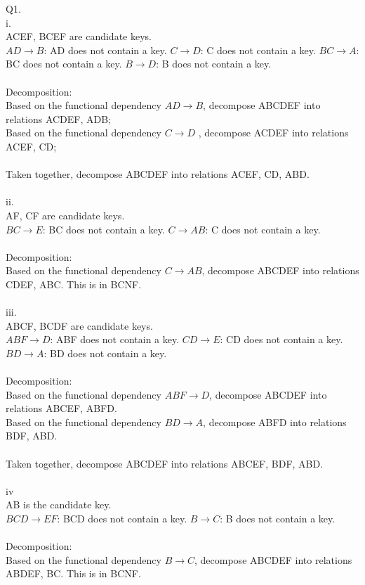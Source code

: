 \documentclass[a4paper]{article}
\begin{document}
Q1.\\
i.\\
ACEF, BCEF are candidate keys.\\
$AD\rightarrow B$: AD does not contain a key. $C\rightarrow D$: C does not contain a key. $BC\rightarrow A$: BC does not contain a key. $B\rightarrow D$: B does not contain a key.\\\\
Decomposition:\\
Based on the functional dependency $AD\rightarrow B$, decompose ABCDEF into relations ACDEF, ADB;\\
Based on the functional dependency $C\rightarrow D$ , decompose ACDEF into relations ACEF, CD;\\\\
Taken together, decompose ABCDEF into relations ACEF, CD, ABD.\\
\\ii.\\
AF, CF are candidate keys.\\
$BC\rightarrow E$: BC does not contain a key. $C\rightarrow AB$: C does not contain a key.\\\\
Decomposition:\\
Based on the functional dependency $C\rightarrow AB$, decompose ABCDEF into relations CDEF, ABC. This is in BCNF.\\
\\iii.\\
ABCF, BCDF are candidate keys.\\
$ABF\rightarrow D$: ABF does not contain a key. $CD\rightarrow E$: CD does not contain a key. $BD\rightarrow A$: BD does not contain a key.\\\\
Decomposition:\\
Based on the functional dependency $ABF\rightarrow D$, decompose ABCDEF into relations ABCEF, ABFD.\\
Based on the functional dependency $BD\rightarrow A$, decompose ABFD into relations BDF, ABD.\\\\
Taken together, decompose ABCDEF into relations ABCEF, BDF, ABD.\\
\\iv\\
AB is the candidate key.\\
$BCD\rightarrow EF$: BCD does not contain a key. $B\rightarrow C$: B does not contain a key.\\ \\
Decomposition:\\
Based on the functional dependency $B\rightarrow C$, decompose ABCDEF into relations ABDEF, BC. This is in BCNF.\\
\end{document}
